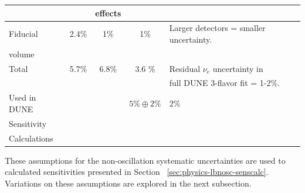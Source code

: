 \begin{table}[!hb]
\begin{center}
\begin{tabular}{|l|c|c|c|l|}
 & & effects & & \\ \hline
Fiducial & 2.4\% & 1\% & 1\% & Larger detectors = smaller uncertainty. \\
volume & & & & \\ \hline\hline
Total  & 5.7\% & 6.8\% & 3.6 \% & Residual $\nu_e$ uncertainty in  \\
& & & & full DUNE 3-flavor fit = 1-2\%. \\ \hline\hline
Used in DUNE & & & $5\% \oplus 2\%$ & 2\% \\
Sensitivity & & & & \\
Calculations & & & & \\ \hline \hline
\end{tabular}
\end{center}
\end{table}

These assumptions for the non-oscillation systematic uncertainties 
are used to calculated sensitivities presented in Section ~\ref{sec:physics-lbnosc-senscalc}.
Variations on these assumptions are explored in the next subsection.


